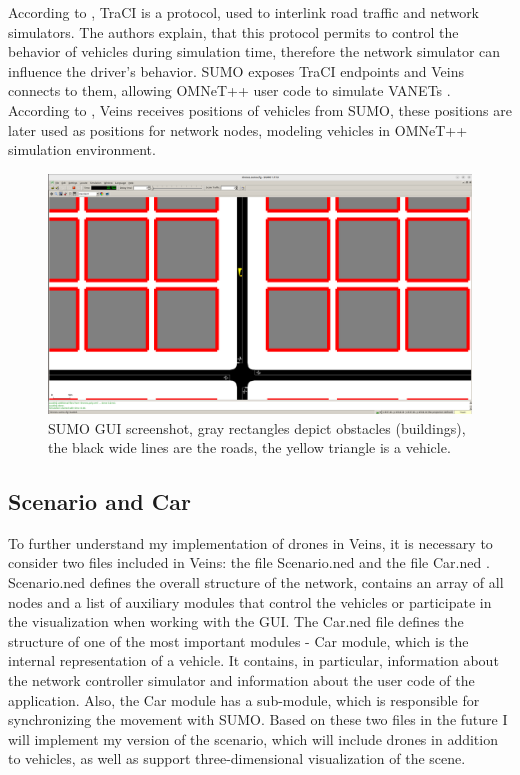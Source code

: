 \documentclass[]{nsm-thesis}
\begin{document}
According to \textcite{traci}, \ac{TraCI} is a protocol, used to interlink road traffic and network simulators. The authors explain, that this protocol permits to control the behavior of vehicles during simulation time, therefore the network simulator can influence the driver's behavior. SUMO exposes \ac{TraCI} endpoints \cite{sumotraci} and Veins connects to them, allowing OMNeT++ user code to simulate \acp{VANET} \cite[Pages~217-218]{Sommer2019}. According to \textcite{Sommer2019}, Veins receives positions of vehicles from SUMO, these positions are later used as positions for network nodes, modeling vehicles in OMNeT++ simulation environment.

\begin{figure}
	\centering
	\includegraphics[width=1\textwidth]{figures/SUMO-GUI.png}
	\caption{SUMO \ac{GUI} screenshot, gray rectangles depict obstacles (buildings), the black wide lines are the roads, the yellow triangle is a vehicle.}
	\label{fig:sumogui}
\end{figure}

\subsection {Scenario and Car}
\label{sec:scenarioned}

To further understand my implementation of drones in Veins, it is necessary to consider two files included in Veins: the file Scenario.ned \cite{scenarioned} and the file Car.ned \cite{carned}. Scenario.ned defines the overall structure of the network, contains an array of all nodes and a list of auxiliary modules that control the vehicles or participate in the visualization when working with the GUI. The Car.ned file defines the structure of one of the most important modules - Car module, which is the internal representation of a vehicle. It contains, in particular, information about the network controller simulator and information about the user code of the application. Also, the Car module has a sub-module, which is responsible for synchronizing the movement with SUMO. Based on these two files in the future I will implement my version of the scenario, which will include drones in addition to vehicles, as well as support three-dimensional visualization of the scene. 
\end{document}
